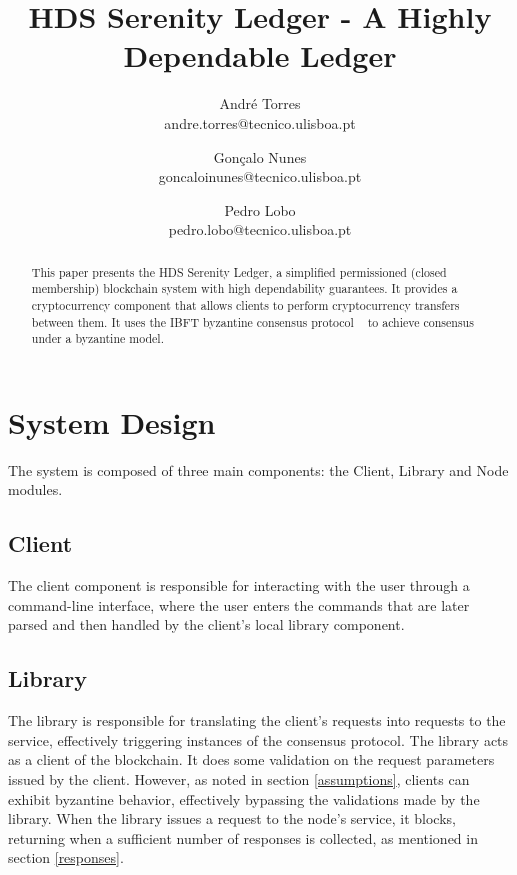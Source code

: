 \documentclass[letterpaper,twocolumn,10pt]{article}
\begin{document}
\date{}

\title{\Large \bf HDS Serenity Ledger - A Highly Dependable Ledger}

\author{
    {\rm André Torres}\\
    andre.torres@tecnico.ulisboa.pt
    \and
    {\rm Gonçalo Nunes}\\
    goncaloinunes@tecnico.ulisboa.pt
    \and
    {\rm Pedro Lobo}\\
    pedro.lobo@tecnico.ulisboa.pt
}

\maketitle

\begin{abstract}
    This paper presents the HDS Serenity Ledger, a simplified permissioned (closed membership) blockchain system with high dependability guarantees. It provides a cryptocurrency component that allows clients to perform cryptocurrency transfers between them. It uses the IBFT byzantine consensus protocol ~\cite{ibft} to achieve consensus under a byzantine model.
\end{abstract}

\section{System Design}

The system is composed of three main components: the Client, Library and Node modules.

\subsection{Client}

The client component is responsible for interacting with the user through a command-line interface, where the user enters the commands that are later parsed and then handled by the client's local library component.

\subsection{Library}

The library is responsible for translating the client's requests into requests to the service, effectively triggering instances of the consensus protocol. The library acts as a client of the blockchain. It does some validation on the request parameters issued by the client. However, as noted in section \ref{assumptions}, clients can exhibit byzantine behavior, effectively bypassing the validations made by the library. When the library issues a request to the node's service, it blocks, returning when a sufficient number of responses is collected, as mentioned in section \ref{responses}.
\end{document}
